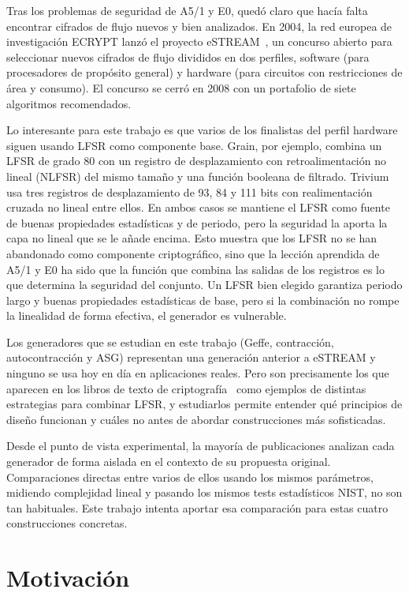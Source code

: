 Tras los problemas de seguridad de A5/1 y E0, quedó claro que hacía falta encontrar cifrados de flujo nuevos y bien analizados.
En 2004, la red europea de investigación ECRYPT lanzó el proyecto eSTREAM~\cite{estream2008},
un concurso abierto para seleccionar nuevos cifrados de flujo divididos en dos perfiles,
software (para procesadores de propósito general) y hardware (para circuitos con restricciones de área y consumo).
El concurso se cerró en 2008 con un portafolio de siete algoritmos recomendados.

Lo interesante para este trabajo es que varios de los finalistas del perfil hardware siguen usando LFSR como componente base.
Grain, por ejemplo, combina un LFSR de grado 80 con un registro de desplazamiento con retroalimentación no lineal (NLFSR)
del mismo tamaño y una función booleana de filtrado. Trivium usa tres registros de desplazamiento de 93, 84 y 111 bits
con realimentación cruzada no lineal entre ellos. En ambos casos se mantiene el LFSR como fuente de buenas propiedades estadísticas
y de periodo, pero la seguridad la aporta la capa no lineal que se le añade encima. Esto muestra que los LFSR no se han abandonado como componente criptográfico,
sino que la lección aprendida de A5/1 y E0 ha sido que la función que combina las salidas de los registros
es lo que determina la seguridad del conjunto. Un LFSR bien elegido garantiza periodo largo y buenas propiedades estadísticas de base,
pero si la combinación no rompe la linealidad de forma efectiva, el generador es vulnerable.

Los generadores que se estudian en este trabajo (Geffe, contracción, autocontracción y ASG)
representan una generación anterior a eSTREAM y ninguno se usa hoy en día en aplicaciones reales.
Pero son precisamente los que aparecen en los libros de texto de criptografía~\cite{menezes1996}
como ejemplos de distintas estrategias para combinar LFSR, y estudiarlos permite entender qué principios de diseño funcionan
y cuáles no antes de abordar construcciones más sofisticadas.

Desde el punto de vista experimental, la mayoría de publicaciones analizan cada generador de forma aislada
en el contexto de su propuesta original. Comparaciones directas entre varios de ellos usando los mismos parámetros,
midiendo complejidad lineal y pasando los mismos tests estadísticos NIST, no son tan habituales.
Este trabajo intenta aportar esa comparación para estas cuatro construcciones concretas.

\section{Motivación}

